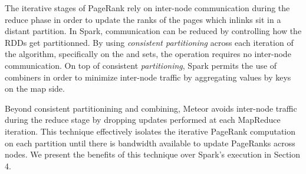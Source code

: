 The iterative stages of PageRank rely on inter-node communication during the reduce phase in order to update the ranks of the pages which inlinks sit in a distant partition. In Spark, communication can be reduced by controlling how the RDDs get partitionned. By using \emph{consistent partitioning} across each iteration of the algorithm, specifically on the  and  sets, the  operation requires no inter-node communication. On top of consistent \emph{partitioning}, Spark permits the use of combiners \cite{hop} in order to minimize inter-node traffic by aggregating values by keys on the map side. 

Beyond consistent partitionining and combining, Meteor avoids inter-node traffic during the reduce stage by dropping updates performed at each MapReduce iteration. This technique effectively isolates the iterative PageRank computation on each partition until there is bandwidth available to update PageRanks across nodes. We present the benefits of this technique over Spark's execution in Section 4.

%

